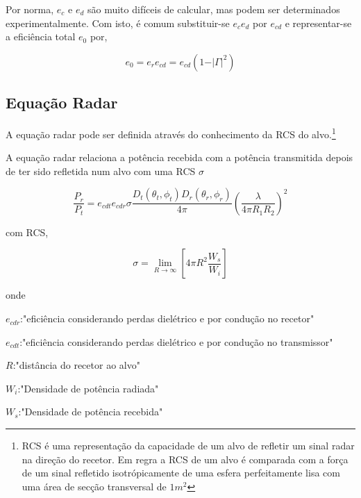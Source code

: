 Por norma, $e_{c}$ e $e_{d}$ são muito difíceis de calcular, mas podem ser determinados experimentalmente. Com isto, é comum substituir-se $e_{c}e_{d}$ por $e_{cd}$ e representar-se a eficiência total $e_{0}$ por,

\begin{equation} \label{3.22}
e_{0}=e_{r}e_{cd}=e_{cd}\left( 1-\vert\Gamma\vert^{2}\right)
\end{equation}






\subsection*{Equação Radar}
A equação radar pode ser definida através do conhecimento da \gls{RCS} do alvo.\footnote{\gls{RCS} é uma representação da capacidade de um alvo de refletir um sinal radar na direção do recetor. Em regra a \gls{RCS} de um alvo é comparada com a força de um sinal refletido isotrópicamente de uma esfera perfeitamente lisa com uma área de secção transversal de $1m^{2}$ }\par 
A equação radar relaciona a potência recebida com a potência transmitida depois de ter sido refletida num alvo com uma \gls{RCS} $\sigma$

\begin{equation} \label{3.26}
\dfrac{P_{r}}{P_{t}}=e_{cdt}e_{cdr}\sigma \dfrac{D_{t}\left( \theta_{t},\phi_{t}\right)D_{r}\left( \theta_{r},\phi_{r}\right) }{4\pi}\left( \dfrac{\lambda}{4\pi R_{1}R_{2}}\right)^{2} 
\end{equation}

com \gls{RCS},

\begin{equation} \label{3.27}
\sigma =\lim_{R\to\infty}\left[ 4\pi R^{2}\dfrac{W_{s}}{W_{i}}\right] 
\end{equation}

onde \par 
$e_{cdr}$:"eficiência considerando perdas dielétrico e por condução no recetor" \par
$e_{cdt}$:"eficiência considerando perdas dielétrico e por condução no transmissor" \par
$R$:"distância do recetor ao alvo" \par
$W_{i}$:"Densidade de potência radiada" \par
$W_{s}$:"Densidade de potência recebida" \par

